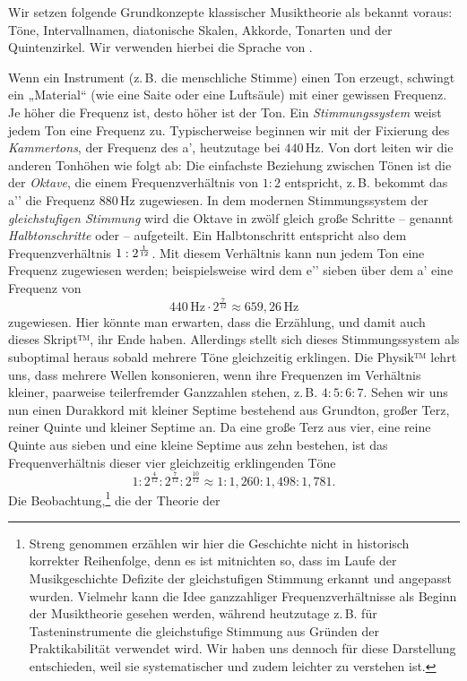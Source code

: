 
Wir setzen folgende Grundkonzepte klassischer Musiktheorie als bekannt voraus:
Töne, Intervallnamen, diatonische Skalen, Akkorde, Tonarten und der
Quintenzirkel. Wir verwenden hierbei die Sprache von \cite{Skript}.

Wenn ein Instrument (z.\,B. die menschliche Stimme) einen Ton erzeugt, schwingt
ein „Material“ (wie eine Saite oder eine Luftsäule) mit einer gewissen Frequenz.
Je höher die Frequenz ist, desto höher ist der Ton. Ein \emph{Stimmungssystem}
weist jedem Ton eine Frequenz zu. Typischerweise beginnen wir mit der Fixierung
des \emph{Kammertons}, der Frequenz des a’, heutzutage bei $440$\,Hz. Von dort
leiten wir die anderen Tonhöhen wie folgt ab: Die einfachste Beziehung zwischen
Tönen ist die der \emph{Oktave}, die einem Frequenzverhältnis von $1:2$
entspricht, z.\,B. bekommt das a’’ die Frequenz $880$\,Hz zugewiesen. In dem
modernen Stimmungssystem der \emph{gleichstufigen Stimmung} wird die Oktave in
zwölf gleich große Schritte – genannt \emph{Halbtonschritte} oder  – 
aufgeteilt. Ein Halbtonschritt entspricht also dem Frequenzverhältnis
$1:2^{\smash{\frac1{12}}}$. Mit diesem Verhältnis kann nun jedem Ton eine
Frequenz zugewiesen werden; beispielsweise wird dem e’’ sieben 
über dem a’ eine Frequenz von 
\[440\,\text{Hz}\cdot 2^{\frac7{12}} \approx 659{,}26\,\text{Hz}\]%
zugewiesen. Hier könnte man erwarten, dass die Erzählung, und damit auch dieses
Skript™, ihr Ende haben. Allerdings stellt sich dieses Stimmungssystem als
suboptimal heraus sobald mehrere Töne gleichzeitig erklingen. Die Physik™ lehrt
uns, dass mehrere Wellen konsonieren, wenn ihre Frequenzen im Verhältnis
kleiner, paarweise teilerfremder Ganzzahlen stehen, z.\,B. $4:5:6:7$. Sehen wir
uns nun einen Durakkord mit kleiner Septime bestehend aus Grundton, großer Terz,
reiner Quinte und kleiner Septime an. Da eine große Terz aus vier, eine reine
Quinte aus sieben und eine kleine Septime aus zehn  bestehen, ist das
Frequenverhältnis dieser vier gleichzeitig erklingenden Töne %
\[1:2^{\frac4{12}}:2^{\frac7{12}}:2^{\frac{10}{12}}\approx
  1:1{,}260:1{,}498:1{,}781.\]%
Die Beobachtung,\footnote{Streng genommen erzählen wir hier die Geschichte nicht
  in historisch korrekter Reihenfolge, denn es ist mitnichten so, dass im Laufe
  der Musikgeschichte Defizite der gleichstufigen Stimmung erkannt und angepasst
  wurden. Vielmehr kann die Idee ganzzahliger Frequenzverhältnisse als Beginn
  der Musiktheorie gesehen werden, während heutzutage z.\,B. für
  Tasteninstrumente die gleichstufige Stimmung aus Gründen der Praktikabilität
  verwendet wird. Wir haben uns dennoch für diese Darstellung entschieden, weil
  sie systematischer und zudem leichter zu verstehen ist.} die der Theorie der
